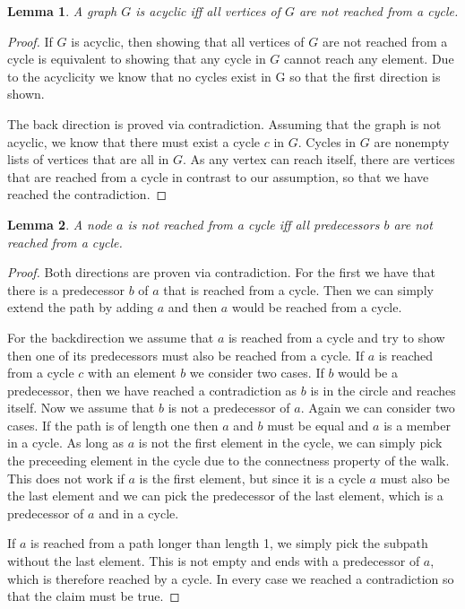 \documentclass{article}
\newtheorem{lemma}{Lemma}
\begin{document}
        \begin{lemma}
            A graph $G$ is acyclic iff all vertices of $G$ are not reached from a cycle.
        \end{lemma}
        \begin{proof}
            If $G$ is acyclic, then showing that all vertices of $G$ are not reached from a cycle is equivalent to showing that any cycle in $G$ cannot reach any element. Due to the acyclicity we know that no cycles exist in G so that the first direction is shown.

            The back direction is proved via contradiction. Assuming that the graph is not acyclic, we know that there must exist a cycle $c$ in $G$. Cycles in $G$ are nonempty lists of vertices that are all in $G$. As any vertex can reach itself, there are vertices that are reached from a cycle in contrast to our assumption, so that we have reached the contradiction.
        \end{proof}

        \begin{lemma}
            A node $a$ is not reached from a cycle iff all predecessors $b$ are not reached from a cycle.
        \end{lemma}
        \begin{proof}
            Both directions are proven via contradiction. For the first we have that there is a predecessor $b$ of $a$ that is reached from a cycle. Then we can simply extend the path by adding $a$ and then $a$ would be reached from a cycle.

            For the backdirection we assume that $a$ is reached from a cycle and try to show then one of its predecessors must also be reached from a cycle. 
            If $a$ is reached from a cycle $c$ with an element $b$ we consider two cases. 
            If $b$ would be a predecessor, then we have reached a contradiction as $b$ is in the circle and reaches itself. Now we assume that $b$ is not a predecessor of $a$. Again we can consider two cases. If the path is of length one then $a$ and $b$ must be equal and $a$ is a member in a cycle. As long as $a$ is not the first element in the cycle, we can simply pick the preceeding element in the cycle due to the connectness property of the walk. This does not work if $a$ is the first element, but since it is a cycle $a$ must also be the last element and we can pick the predecessor of the last element, which is a predecessor of $a$ and in a cycle.

            If $a$ is reached from a path longer than length 1, we simply pick the subpath without the last element. This is not empty and ends with a predecessor of $a$, which is therefore reached by a cycle. In every case we reached a contradiction so that the claim must be true.
        \end{proof}
\end{document}
